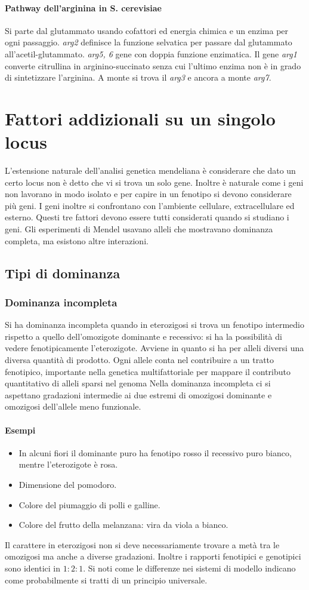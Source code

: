 \paragraph{Pathway dell'arginina in S. cerevisiae}
Si parte dal glutammato usando cofattori ed energia chimica e un enzima per ogni passaggio. \emph{arg2} definisce la funzione selvatica per passare dal glutammato 
all'acetil-glutammato. \emph{arg5, 6} gene con doppia funzione enzimatica. Il gene \emph{arg1} converte citrullina in arginino-succinato senza cui l'ultimo enzima non \`e in grado 
di sintetizzare l'arginina. A monte si trova il \emph{arg3} e ancora a monte \emph{arg7}. 
\section{Fattori addizionali su un singolo locus}
L'estensione naturale dell'analisi genetica mendeliana \`e considerare che dato un certo locus non \`e detto che vi si trova un solo gene. Inoltre \`e naturale come i geni non 
lavorano in modo isolato e per capire in un fenotipo si devono considerare pi\`u geni. I geni inoltre si confrontano con l'ambiente cellulare, extracellulare ed esterno. Questi tre
fattori devono essere tutti considerati quando si studiano i geni. Gli esperimenti di Mendel usavano alleli che mostravano dominanza completa, ma esistono altre interazioni.
\subsection{Tipi di dominanza}
\subsubsection{Dominanza incompleta}
Si ha dominanza incompleta quando in eterozigosi si trova un fenotipo intermedio rispetto a quello dell'omozigote dominante e recessivo: si ha la possibilit\`a di vedere fenotipicamente l'eterozigote.  
Avviene in quanto si ha per alleli diversi una diversa quantit\`a di prodotto. Ogni allele conta nel contribuire a un tratto fenotipico, importante nella genetica multifattoriale per mappare il contributo
quantitativo di alleli sparsi nel genoma  Nella dominanza incompleta ci si aspettano gradazioni intermedie ai due estremi di omozigosi dominante e omozigosi dell'allele meno funzionale. 
\paragraph{Esempi}
\begin{itemize}
	\item In alcuni fiori il dominante puro ha fenotipo rosso il recessivo puro bianco, mentre l'eterozigote \`e rosa.
	\item Dimensione del pomodoro.
	\item Colore del piumaggio di polli e galline.
	\item Colore del frutto della melanzana: vira da viola a bianco.
\end{itemize}
Il carattere in eterozigosi non si deve necessariamente trovare a met\`a tra le omozigosi ma anche a diverse gradazioni. Inoltre i rapporti fenotipici e genotipici sono identici in $1:2:1$. 
Si noti come le differenze nei sistemi di modello indicano come probabilmente si tratti di un principio universale. 
